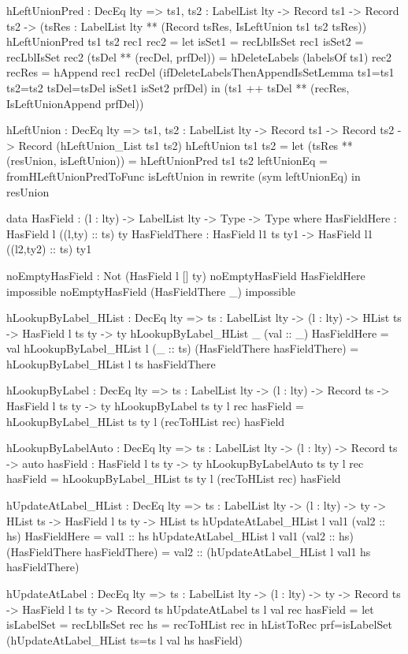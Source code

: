 \begin{code}
hLeftUnionPred : DecEq lty => {ts1, ts2 : LabelList lty} -> 
  Record ts1 -> Record ts2 ->
  (tsRes : LabelList lty ** 
    (Record tsRes, IsLeftUnion ts1 ts2 tsRes))
hLeftUnionPred {ts1} {ts2} rec1 rec2 = 
  let
    isSet1 = recLblIsSet rec1
    isSet2 = recLblIsSet rec2
    (tsDel ** (recDel, prfDel)) = 
      hDeleteLabels (labelsOf ts1) rec2
    recRes = 
      hAppend rec1 recDel 
        (ifDeleteLabelsThenAppendIsSetLemma {ts1=ts1} 
          {ts2=ts2} {tsDel=tsDel} isSet1 isSet2 prfDel)
   in
    (ts1 ++ tsDel ** (recRes, IsLeftUnionAppend prfDel))

hLeftUnion : DecEq lty => {ts1, ts2 : LabelList lty} -> 
  Record ts1 -> Record ts2 -> Record (hLeftUnion_List ts1 ts2)
hLeftUnion ts1 ts2 =
  let (tsRes ** (resUnion, isLeftUnion)) = hLeftUnionPred ts1 ts2
      leftUnionEq = fromHLeftUnionPredToFunc isLeftUnion
  in rewrite (sym leftUnionEq) in resUnion 

data HasField : (l : lty) -> LabelList lty -> Type -> Type where
  HasFieldHere : HasField l ((l,ty) :: ts) ty
  HasFieldThere : HasField l1 ts ty1 -> 
    HasField l1 ((l2,ty2) :: ts) ty1
  
noEmptyHasField : Not (HasField l [] ty)  
noEmptyHasField HasFieldHere impossible
noEmptyHasField (HasFieldThere _) impossible

hLookupByLabel_HList : DecEq lty => {ts : LabelList lty} -> 
  (l : lty) -> HList ts -> HasField l ts ty -> ty
hLookupByLabel_HList _ (val :: _) HasFieldHere = val
hLookupByLabel_HList l (_ :: ts) (HasFieldThere hasFieldThere) = 
  hLookupByLabel_HList l ts hasFieldThere

hLookupByLabel : DecEq lty => {ts : LabelList lty} -> 
  (l : lty) -> Record ts -> HasField l ts ty -> ty
hLookupByLabel {ts} {ty} l rec hasField = 
  hLookupByLabel_HList {ts} {ty} l (recToHList rec) hasField

hLookupByLabelAuto : DecEq lty => {ts : LabelList lty} -> 
  (l : lty) -> Record ts -> 
  {auto hasField : HasField l ts ty} -> ty
hLookupByLabelAuto {ts} {ty} l rec {hasField} = 
  hLookupByLabel_HList {ts} {ty} l (recToHList rec) hasField


hUpdateAtLabel_HList : DecEq lty => {ts : LabelList lty} -> 
  (l : lty) -> ty -> HList ts -> HasField l ts ty -> HList ts
hUpdateAtLabel_HList l val1 (val2 :: hs) HasFieldHere = 
  val1 :: hs
hUpdateAtLabel_HList l val1 (val2 :: hs) 
  (HasFieldThere hasFieldThere) = 
  val2 :: (hUpdateAtLabel_HList l val1 hs hasFieldThere)

hUpdateAtLabel : DecEq lty => {ts : LabelList lty} -> 
  (l : lty) -> ty -> Record ts -> HasField l ts ty -> Record ts
hUpdateAtLabel {ts} l val rec hasField =
  let
    isLabelSet = recLblIsSet rec
    hs = recToHList rec
  in
    hListToRec {prf=isLabelSet} 
      (hUpdateAtLabel_HList {ts=ts} l val hs hasField)
    

\end{code}
